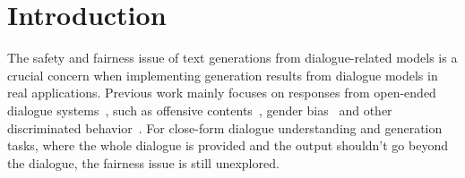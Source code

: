 \section{Introduction}


The safety and fairness issue of text generations from 
dialogue-related models is a crucial concern when implementing 
generation results from dialogue models in real applications. 
Previous work mainly focuses on responses from open-ended dialogue systems~\cite{xu2020recipes, henderson2018ethical}, such as offensive contents~\cite{baheti2021just}, gender bias~\cite{liu2020does,dinan2020queens} and other discriminated behavior~\cite{sheng2021revealing,smith2021hi}. For close-form dialogue 
understanding and generation tasks, where the whole dialogue is provided and the 
output shouldn't go beyond the dialogue, 
the fairness issue is still unexplored.


